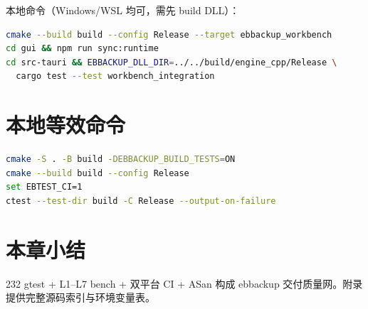 本地命令（Windows/WSL 均可，需先 build DLL）：
\begin{lstlisting}[language=bash,caption={Workbench IT}]
cmake --build build --config Release --target ebbackup_workbench
cd gui && npm run sync:runtime
cd src-tauri && EBBACKUP_DLL_DIR=../../build/engine_cpp/Release \
  cargo test --test workbench_integration
\end{lstlisting}

\section{本地等效命令}

\begin{lstlisting}[language=bash,caption={本地 CI 等效}]
cmake -S . -B build -DEBBACKUP_BUILD_TESTS=ON
cmake --build build --config Release
set EBTEST_CI=1
ctest --test-dir build -C Release --output-on-failure
\end{lstlisting}

\section{本章小结}

232 gtest + L1--L7 bench + 双平台 CI + ASan 构成 ebbackup 交付质量网。附录提供完整源码索引与环境变量表。
